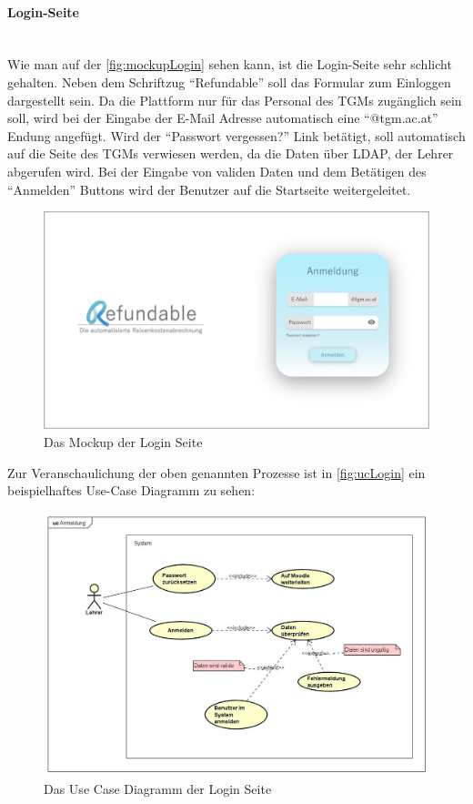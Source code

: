 \paragraph{Login-Seite}
~\\
Wie man auf der \autoref{fig:mockupLogin} sehen kann, ist die Login-Seite sehr schlicht gehalten. Neben dem Schriftzug \enquote{Refundable} soll das Formular zum Einloggen dargestellt sein. Da die Plattform nur für das Personal des TGMs zugänglich sein soll, wird bei der Eingabe der E-Mail Adresse automatisch eine \enquote{@tgm.ac.at} Endung angefügt. Wird der \enquote{Passwort vergessen?} Link betätigt, soll automatisch auf die Seite des TGMs verwiesen werden, da die Daten über LDAP, der Lehrer abgerufen wird. Bei der Eingabe von validen Daten und dem Betätigen des \enquote{Anmelden} Buttons wird der Benutzer auf die Startseite weitergeleitet.
\begin{figure}[H]
	\centering
	\includegraphics[width=1\linewidth]{images/ldehner_konzept/Mockup-Startseite}
	\caption[Mockup Login]{Das Mockup der Login Seite}
	\label{fig:mockupLogin}
\end{figure}
Zur Veranschaulichung der oben genannten Prozesse ist in \autoref{fig:ucLogin} ein beispielhaftes Use-Case Diagramm zu sehen: 
\begin{figure}[H]
	\centering
	\includegraphics[width=1\linewidth]{images/ldehner_konzept/uc-login}
	\caption[Use Case Diagramm Login]{Das Use Case Diagramm der Login Seite}
	\label{fig:ucLogin}
\end{figure}
\newpage
